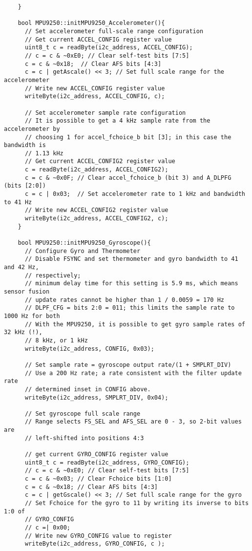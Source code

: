 \begin{lstlisting}
	}

	bool MPU9250::initMPU9250_Accelerometer(){
	  // Set accelerometer full-scale range configuration
	  // Get current ACCEL_CONFIG register value
	  uint8_t c = readByte(i2c_address, ACCEL_CONFIG);
	  // c = c & ~0xE0; // Clear self-test bits [7:5]
	  c = c & ~0x18;  // Clear AFS bits [4:3]
	  c = c | getAscale() << 3; // Set full scale range for the accelerometer
	  // Write new ACCEL_CONFIG register value
	  writeByte(i2c_address, ACCEL_CONFIG, c);

	  // Set accelerometer sample rate configuration
	  // It is possible to get a 4 kHz sample rate from the accelerometer by
	  // choosing 1 for accel_fchoice_b bit [3]; in this case the bandwidth is
	  // 1.13 kHz
	  // Get current ACCEL_CONFIG2 register value
	  c = readByte(i2c_address, ACCEL_CONFIG2);
	  c = c & ~0x0F; // Clear accel_fchoice_b (bit 3) and A_DLPFG (bits [2:0])
	  c = c | 0x03;  // Set accelerometer rate to 1 kHz and bandwidth to 41 Hz
	  // Write new ACCEL_CONFIG2 register value
	  writeByte(i2c_address, ACCEL_CONFIG2, c);
	}

	bool MPU9250::initMPU9250_Gyroscope(){
	  // Configure Gyro and Thermometer
	  // Disable FSYNC and set thermometer and gyro bandwidth to 41 and 42 Hz,
	  // respectively;
	  // minimum delay time for this setting is 5.9 ms, which means sensor fusion
	  // update rates cannot be higher than 1 / 0.0059 = 170 Hz
	  // DLPF_CFG = bits 2:0 = 011; this limits the sample rate to 1000 Hz for both
	  // With the MPU9250, it is possible to get gyro sample rates of 32 kHz (!),
	  // 8 kHz, or 1 kHz
	  writeByte(i2c_address, CONFIG, 0x03);

	  // Set sample rate = gyroscope output rate/(1 + SMPLRT_DIV)
	  // Use a 200 Hz rate; a rate consistent with the filter update rate
	  // determined inset in CONFIG above.
	  writeByte(i2c_address, SMPLRT_DIV, 0x04);

	  // Set gyroscope full scale range
	  // Range selects FS_SEL and AFS_SEL are 0 - 3, so 2-bit values are
	  // left-shifted into positions 4:3

	  // get current GYRO_CONFIG register value
	  uint8_t c = readByte(i2c_address, GYRO_CONFIG);
	  // c = c & ~0xE0; // Clear self-test bits [7:5]
	  c = c & ~0x03; // Clear Fchoice bits [1:0]
	  c = c & ~0x18; // Clear AFS bits [4:3]
	  c = c | getGscale() << 3; // Set full scale range for the gyro
	  // Set Fchoice for the gyro to 11 by writing its inverse to bits 1:0 of
	  // GYRO_CONFIG
	  // c =| 0x00;
	  // Write new GYRO_CONFIG value to register
	  writeByte(i2c_address, GYRO_CONFIG, c );


\end{lstlisting}
